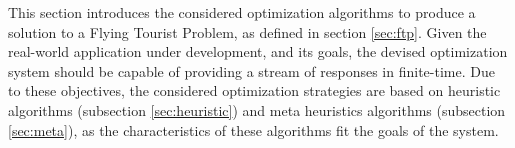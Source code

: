 This section introduces the considered optimization algorithms to produce a solution to a Flying Tourist Problem, as defined in section \ref{sec:ftp}. Given the real-world application under development, and its goals, the devised optimization system should be capable of providing a stream of responses in finite-time. Due to these objectives, the considered optimization strategies are based on heuristic algorithms (subsection \ref{sec:heuristic}) and meta heuristics algorithms (subsection \ref{sec:meta}), as the characteristics of these algorithms fit the goals of the system.


